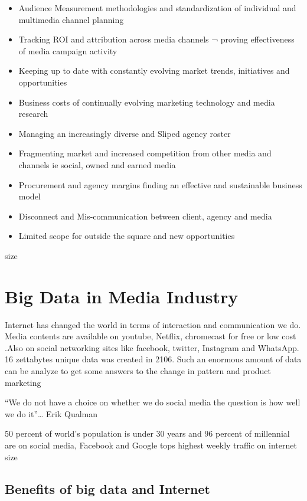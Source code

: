 \documentclass[sigconf]{acmart}
\begin{document}
\begin{itemize}
\item Audience Measurement methodologies and standardization of individual and multimedia channel planning
\item Tracking ROI and attribution across media channels ¬ proving effectiveness of media campaign activity
\item Keeping up to date with constantly evolving market trends, initiatives and opportunities
\item Business costs of continually evolving marketing technology and media research
\item Managing an increasingly diverse and Sliped agency roster
\item Fragmenting market and increased competition from other media and channels ie social, owned and earned media
\item Procurement and agency margins  finding an effective and sustainable business model
\item Disconnect and Mis-communication between client, agency and media
\item Limited scope for outside the square and new opportunities
\end{itemize}
size \cite{Failures}

\section{Big Data in Media Industry}

Internet has changed the world in terms of interaction and communication we do. Media contents are available on youtube, Netflix, chromecast for free or low cost .Also on social networking sites like facebook, twitter, Instagram and WhatsApp.
16 zettabytes unique data was created in 2106. Such an enormous amount of data can be analyze to get some answers to the change in pattern and product marketing

“We do not have a choice on whether we do social media the question is how well we do it”… Erik Qualman
                    
50 percent of world’s population is under 30 years and 96 percent of millennial are on social media, Facebook and Google tops highest weekly traffic on internet
size \cite{Stats}

\subsection{Benefits of big data and Internet}
\end{document}
